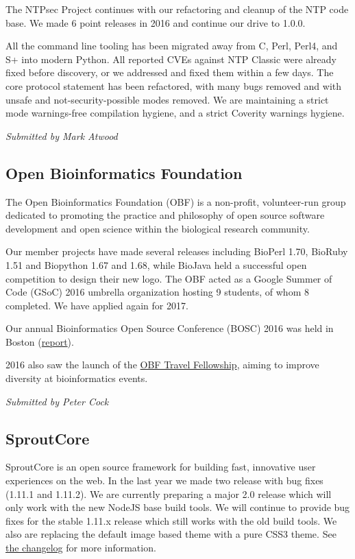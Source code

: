 \documentclass[letterpaper]{report}
\begin{document}
The NTPsec Project continues with our refactoring and cleanup of the NTP
code base.  We made 6 point releases in 2016 and continue our drive to 1.0.0.

All the command line tooling has been migrated away from C, Perl, Perl4,
and S+ into modern Python.  All reported CVEs against NTP Classic were
already fixed before discovery, or we addressed and fixed them within a
few days.  The core protocol statement has been refactored, with many
bugs removed and with unsafe and not-security-possible modes removed.
We are maintaining a strict mode warnings-free compilation hygiene, and
a strict Coverity warnings hygiene.

{\em Submitted by Mark Atwood}

\subsection{Open Bioinformatics Foundation}

The Open Bioinformatics Foundation (OBF) is a non-profit, volunteer-run
group dedicated to promoting the practice and philosophy of open source
software development and open science within the biological research
community.

Our member projects have made several releases including BioPerl 1.70,
BioRuby 1.51 and Biopython 1.67 and 1.68, while BioJava held a
successful open competition to design their new logo. The OBF acted as a
Google Summer of Code (GSoC) 2016 umbrella organization hosting 9
students, of whom 8 completed. We have applied again for 2017.

Our annual Bioinformatics Open Source Conference (BOSC) 2016 was held in
Boston (\href{http://dx.doi.org/10.12688/f1000research.9663.1}{report}).

2016 also saw the launch of the
\href{https://news.open-bio.org/2016/03/01/obf-travel-fellowship-program/}{OBF
Travel Fellowship}, aiming to improve diversity at bioinformatics
events.

{\em Submitted by Peter Cock}

\subsection{SproutCore}

SproutCore is an open source framework for building fast, innovative
user experiences on the web. In the last year we made two release with
bug fixes (1.11.1 and 1.11.2). We are currently preparing a major 2.0
release which will only work with the new NodeJS base build tools. We
will continue to provide bug fixes for the stable 1.11.x release which
still works with the old build tools. We also are replacing the default
image based theme with a pure CSS3 theme.  See
\href{https://github.com/sproutcore/sproutcore/blob/master/CHANGELOG.md}{the
changelog} for more information.
\end{document}
